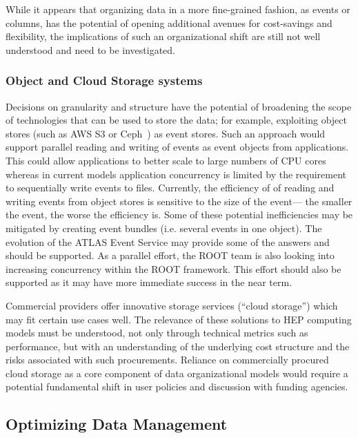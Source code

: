 \documentclass[12pt,a4paper]{article}
\begin{document}
While it appears that organizing data in a more fine-grained fashion, as
events or columns, has the potential of opening additional avenues for
cost-savings and flexibility, the implications of such an organizational
shift are still not well understood and need to be investigated.

\subsubsection{Object and Cloud Storage
systems}\label{object-and-cloud-storage-systems}

Decisions on granularity and structure have the potential of broadening
the scope of technologies that can be used to store the data; for
example, exploiting object stores (such as AWS S3 or Ceph~\cite{Weil:2006:CSH:1298455.1298485}) as event stores. Such an approach
would support parallel reading and writing of events as
event objects from applications. This could allow applications to better
scale to large numbers of CPU cores whereas in current models application
concurrency is limited by the requirement to sequentially write events
to files. Currently, the efficiency of of reading and writing events
from object stores is sensitive to the size of the event---
the smaller the event, the worse the efficiency is. Some of these potential inefficiencies
may be mitigated by creating event bundles (i.e. several events in one object). The
evolution of the ATLAS Event Service may provide some of the answers and
should be supported. As a parallel effort, the ROOT team is also looking
into increasing concurrency within the ROOT framework. This effort
should also be supported as it may have more immediate success in the
near term.

Commercial providers offer innovative storage services (``cloud
storage'') which may fit certain use cases well. The relevance of these
solutions to HEP computing models must be understood, not only through
technical metrics such as performance, but with an understanding of the
underlying cost structure and the risks associated with such
procurements. Reliance on commercially procured cloud storage as a core
component of data organizational models would require a potential
fundamental shift in user policies and discussion with funding agencies.

\subsection{Optimizing Data Management}\label{optimizing-data-management}
\end{document}
